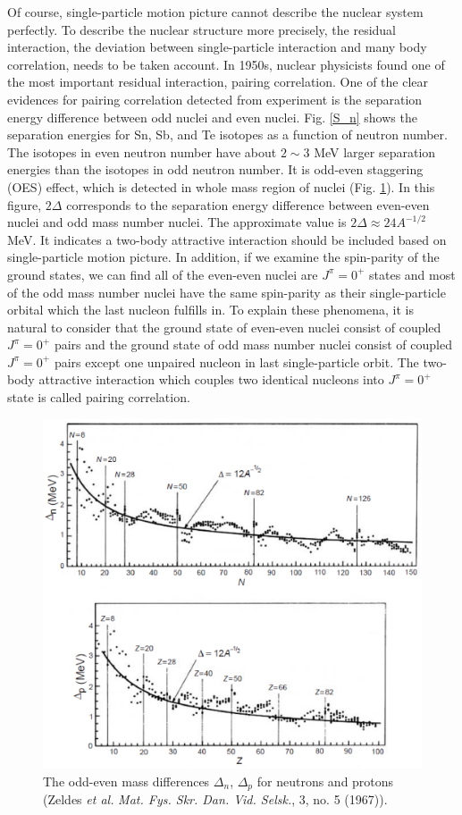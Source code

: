 \documentclass[11pt]{book} %
\begin{document}
Of course, single-particle motion picture cannot describe the nuclear system perfectly. To describe the nuclear structure more precisely, the residual interaction, the deviation between single-particle interaction and many body correlation, needs to be taken account. In 1950s, nuclear physicists found one of the most important residual interaction, pairing correlation. One of the clear evidences for pairing correlation detected from experiment is the separation energy difference between odd nuclei and even nuclei. Fig. \ref{S_n} shows the separation energies for Sn, Sb, and Te isotopes as a function of neutron number. The isotopes in even neutron number have about $2\sim3$ MeV larger separation energies than the isotopes in odd neutron number.
It is odd-even staggering (OES) effect, which is detected in whole mass region of nuclei (Fig. \ref{gap}). In this figure, $2\Delta$ corresponds to the separation energy difference between even-even nuclei and odd mass number nuclei. The approximate value is $2\Delta \approx 24A^{-1/2}$ MeV. It indicates a two-body attractive interaction should be included based on single-particle motion picture. In addition, if we examine the spin-parity of the ground states, we can find all of the even-even nuclei are $J^{\pi}=0^+$ states and most of the odd mass number nuclei have the same spin-parity as their single-particle orbital which the last nucleon fulfills in.
To explain these phenomena, it is natural to consider that the ground state of even-even nuclei consist of coupled $J^{\pi}=0^+$ pairs and the ground state of odd mass number nuclei consist of coupled $J^{\pi}=0^+$ pairs except one unpaired nucleon in last single-particle orbit. The two-body attractive interaction which couples two identical nucleons into $J^{\pi}=0^+$ state is called pairing correlation.

\begin{figure}[tb]
 \begin{center}
    \includegraphics[width=120mm]{images/gap.eps}
 \end{center}
  \caption{The odd-even mass differences $\Delta_n$, $\Delta_p$ for neutrons and protons (Zeldes {\it et al.} {\it Mat. Fys. Skr. Dan. Vid. Selsk.}, 3, no. 5 (1967)).}
  \label{gap}
\end{figure}
\end{document}
